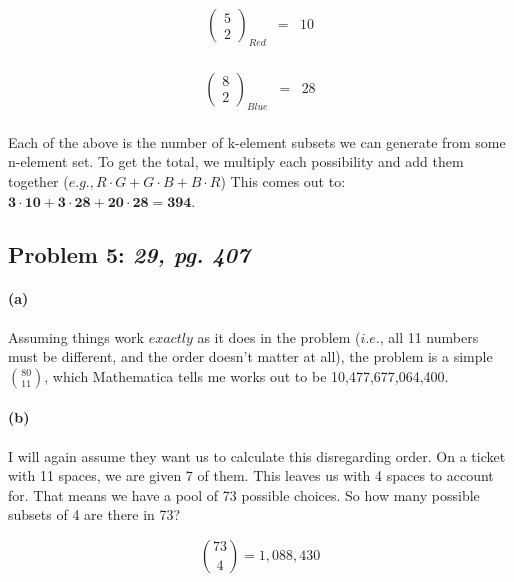 \documentclass[a4paper]{article}
\begin{document}
\begin{equation}
\begin{array}{rll}
\left ( \begin{array}{c} 5 \\ 2 \end{array} \right )_{Red} & = & 10 \\[.15in]
\end{array}
\end{equation}

\begin{equation}
\begin{array}{rll}
\left ( \begin{array}{c} 8 \\ 2 \end{array} \right )_{Blue} & = & 28 \\[.15in]
\end{array}
\end{equation}

Each of the above is the number of k-element subsets we can generate from some n-element set. To get the total, we multiply each possibility and add them together ($\textit{e.g.}, R \cdot G + G \cdot B + B \cdot R$) This comes out to: $\mathbf{3 \cdot 10 + 3 \cdot 28 + 20 \cdot 28 = 394}$.

\subsection*{Problem 5: \textit{29, pg. 407}}

\paragraph{(a)} Assuming things work $\textit{exactly}$ as it does in the problem ($\textit{i.e.}$, all 11 numbers must be different, and the order doesn't matter at all), the problem is a simple $80 \choose 11$, which Mathematica tells me works out to be 10,477,677,064,400.

\paragraph{(b)} I will again assume they want us to calculate this disregarding order. On a ticket with 11 spaces, we are given 7 of them. This leaves us with 4 spaces to account for. That means we have a pool of 73 possible choices. So how many possible subsets of 4 are there in 73?

\begin{equation}
{73 \choose 4} = 1,088,430
\end{equation}
\end{document}
